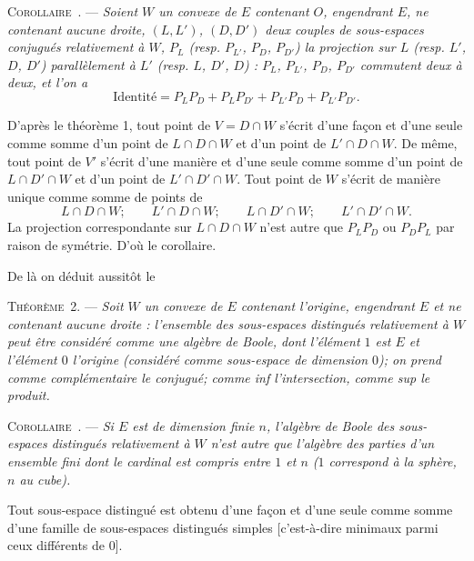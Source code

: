 \documentclass[11pt]{article}
\newcommand{\bzcf}[2]{#1}
\newcommand{\bznum}[1]{\if\relax\detokenize{#1}\relax\else\ #1\fi}
\newenvironment{theoreme}[1][]{\par\medskip\noindent\textsc{Théorème\bznum{#1}.} --- \itshape}{\par\medskip}
\newenvironment{corollaire}[1][]{\par\medskip\noindent\textsc{Corollaire\bznum{#1}.} --- \itshape}{\par\medskip}
\newenvironment{proof}[1][]{\par}{\par}
\begin{document}
\begin{corollaire}
Soient $W$ un convexe de $E$ contenant $O$, engendrant $E$, ne contenant aucune droite, $(L, L')$,
$(D, D')$ deux couples de sous-espaces conjugués relativement à $W$, $P_L$ (resp. $P_{L'}$,
$P_D$, $P_{D'}$) la projection sur $L$ (resp. $L'$, $D$, $D'$) parallèlement à $L'$ (resp. $L$,
$D'$, $D$) : $P_L$, $P_{L'}$, $P_D$, $P_{D'}$ commutent deux à deux, et l'on a
\[ \text{Identité}=P_LP_D+P_LP_{D'}+P_{L'}P_D+P_{L'}P_{D'}. \]
\end{corollaire}

\begin{proof}
D'après \bzcf{le théorème 1}{\ref{bzthm:c3s2t1_conjugues_intersection}}, tout point de
$V=D\cap W$ s'écrit d'une façon et d'une seule comme somme d'un point de $L\cap D\cap W$ et d'un
point de $L'\cap D\cap W$. De même, tout point de $V'$ s'écrit d'une manière et d'une seule comme
somme d'un point de $L\cap D'\cap W$ et d'un point de $L'\cap D'\cap W$. Tout point de $W$ s'écrit
de manière unique comme somme de points de
\[ L\cap D\cap W;\qquad L'\cap D\cap W;\qquad L\cap D'\cap W;\qquad L'\cap D'\cap W. \]
La projection correspondante sur $L\cap D\cap W$ n'est autre que $P_LP_D$ ou $P_DP_L$ par raison
de symétrie. D'où le corollaire.
\end{proof}

De là on déduit aussitôt le

\begin{theoreme}[2]
Soit $W$ un convexe de $E$ contenant l'origine, engendrant $E$ et ne contenant aucune droite :
l'ensemble des sous-espaces distingués relativement à $W$ peut être considéré comme une algèbre
de Boole, dont l'élément $1$ est $E$ et l'élément $0$ l'origine (considéré comme sous-espace de
dimension $0$); on prend comme complémentaire le conjugué; comme \textup{inf} l'intersection,
comme \textup{sup} le produit.
\end{theoreme}

\begin{corollaire}
Si $E$ est de dimension finie $n$, l'algèbre de Boole des sous-espaces distingués relativement à
$W$ n'est autre que l'algèbre des parties d'un ensemble fini dont le cardinal est compris entre
$1$ et $n$ ($1$ correspond à la sphère, $n$ au cube).

Tout sous-espace distingué est obtenu d'une façon et d'une seule comme somme d'une famille de
sous-espaces distingués simples [c'est-à-dire minimaux parmi ceux différents de $0$].
\end{corollaire}
\end{document}
